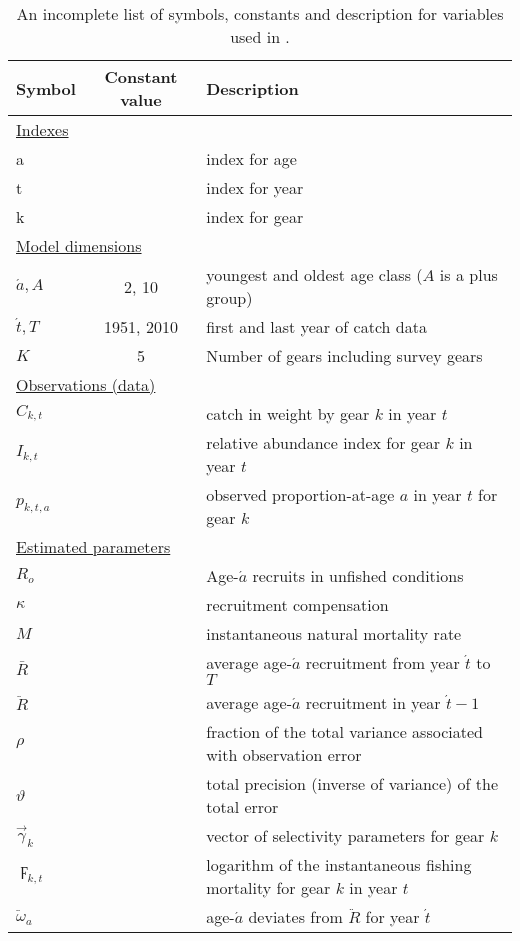 \begin{table}[htdp]
\caption{An incomplete list of symbols, constants and description for variables used in \iscam.}\label{TableSymbols}
\begin{center}
\begin{tabular}{lcl}
\hline
Symbol & Constant value & Description\\
\hline
\multicolumn{3}{l}{\underline{Indexes}}\\
a & & index for age\\
t & & index for year\\
k & & index for gear\\
\multicolumn{3}{l}{\underline{Model dimensions}}\\
$\acute{a}, A$ & 2, 10& youngest and oldest age class ($A$ is a plus group)\\
$\acute{t}, T$ & 1951, 2010 & first and last year of catch data\\
$K$ & 5 & Number of gears including survey gears\\
\multicolumn{3}{l}{\underline{Observations (data)}}\\
$C_{k,t}$ & & catch in weight by gear $k$ in year $t$\\
$I_{k,t}$ & & relative abundance index for gear $k$ in year $t$\\
$p_{k,t,a}$& & observed proportion-at-age $a$ in year $t$ for gear $k$\\
\multicolumn{3}{l}{\underline{Estimated parameters}}\\
$R_o$ & & Age-$\acute{a}$ recruits in unfished conditions\\
$\kappa$ & & recruitment compensation\\
$M$ & & instantaneous natural mortality rate \\
$\bar{R}$ & & average age-$\acute{a}$ recruitment from year $\acute{t}$ to $T$\\
$\ddot{R}$ & & average age-$\acute{a}$ recruitment in year $\acute{t}-1$\\
$\rho$ & & fraction of the total variance associated with observation error\\
$\vartheta$ & & total precision (inverse of variance) of the total error\\
$\vec{\gamma}_k$ & & vector of selectivity parameters for gear $k$\\
$\digamma_{k,t}$ & & logarithm of the instantaneous fishing mortality for gear $k$ in year $t$\\
$\ddot{\omega}_a$&& age-$\acute{a}$ deviates from $\ddot{R}$ for year $\acute{t}$\\

\end{tabular}
\end{center}
\end{table}
